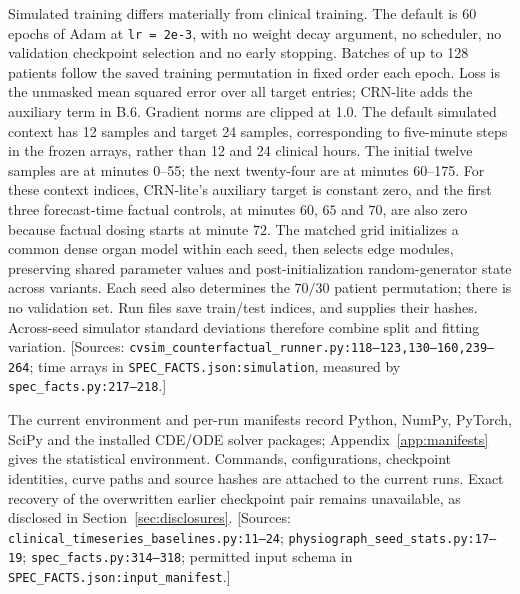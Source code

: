 Simulated training differs materially from clinical training. The default is 60 epochs of Adam at \texttt{lr =\allowbreak{} 2e-3}, with no weight decay argument, no scheduler, no validation checkpoint selection and no early stopping. Batches of up to 128 patients follow the saved training permutation in fixed order each epoch. Loss is the unmasked mean squared error over all target entries; CRN-lite adds the auxiliary term in B.6. Gradient norms are clipped at 1.0. The default simulated context has 12 samples and target 24 samples, corresponding to five-minute steps in the frozen arrays, rather than 12 and 24 clinical hours. The initial twelve samples are at minutes 0–55; the next twenty-four are at minutes 60–175. For these context indices, CRN-lite's auxiliary target is constant zero, and the first three forecast-time factual controls, at minutes $60$, $65$ and $70$, are also zero because factual dosing starts at minute $72$. The matched grid initializes a common dense organ model within each seed, then selects edge modules, preserving shared parameter values and post-initialization random-generator state across variants. Each seed also determines the $70/30$ patient permutation; there is no validation set. Run files save train/test indices, and  supplies their hashes. Across-seed simulator standard deviations therefore combine split and fitting variation. [Sources: \texttt{cvsim\_\allowbreak{}counterfactual\_\allowbreak{}runner.\allowbreak{}py:\allowbreak{}118–\allowbreak{}123,\allowbreak{}130–\allowbreak{}160,\allowbreak{}239–\allowbreak{}264}; time arrays in \texttt{SPEC\_\allowbreak{}FACTS.\allowbreak{}json:\allowbreak{}simulation}, measured by \texttt{spec\_\allowbreak{}facts.\allowbreak{}py:\allowbreak{}217–\allowbreak{}218}.]

The current environment and per-run manifests record Python, NumPy, PyTorch, SciPy and the installed CDE/ODE solver packages; Appendix~\ref{app:manifests} gives the statistical environment. Commands, configurations, checkpoint identities, curve paths and source hashes are attached to the current runs. Exact recovery of the overwritten earlier checkpoint pair remains unavailable, as disclosed in Section~\ref{sec:disclosures}. [Sources: \texttt{clinical\_\allowbreak{}timeseries\_\allowbreak{}baselines.\allowbreak{}py:\allowbreak{}11–\allowbreak{}24}; \texttt{physiograph\_\allowbreak{}seed\_\allowbreak{}stats.\allowbreak{}py:\allowbreak{}17–\allowbreak{}19}; \texttt{spec\_\allowbreak{}facts.\allowbreak{}py:\allowbreak{}314–\allowbreak{}318}; permitted input schema in \texttt{SPEC\_\allowbreak{}FACTS.\allowbreak{}json:\allowbreak{}input\_\allowbreak{}manifest}.]

